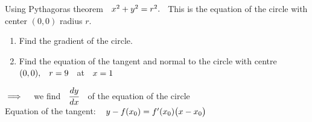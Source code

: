 \documentclass[11pt,a4paper]{article}
\begin{document}
\begin{figure}[H]
\centering
{}
\end{figure}















Using Pythagoras theorem $\hspace{0.2cm} x^2 + y^2 = r^2.\hspace{0.2cm}$ This is the equation of the circle with center $(0,0)$ radius $r$.

\begin{enumerate}
\item Find the gradient of the circle.
\item Find the equation of the tangent and normal to the circle with centre $(0,0),\hspace{0.3cm} r = 9\hspace{0.2cm}$ at $\hspace{0.2cm} x = 1$\\
\end{enumerate}



$\implies\hspace{0.3cm} $ we find $\hspace{0.2cm}\dfrac{dy}{dx}\hspace{0.2cm}$ of the equation of the circle\\

Equation of the tangent: $\hspace{0.3cm} y - f(x_0) = f'(x_0) \big( x - x_0\big)$\\\\
\end{document}
